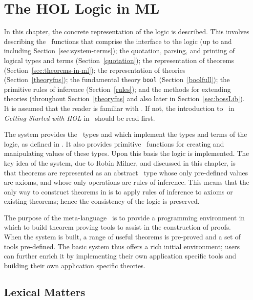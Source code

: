 \chapter{The HOL Logic in ML}\label{HOLsyschapter}

In this chapter, the concrete representation of the \HOL{} logic is
described.  This involves describing the \ML\ functions that comprise
the interface to the logic (up to and including
Section~\ref{sec:system-terms}); the quotation, parsing, and printing of
logical types and terms (Section~\ref{quotation}); the representation of
theorems (Section~\ref{sec:theorems-in-ml}); the representation of theories
(Section~\ref{theoryfns}); the fundamental \HOL{} theory \texttt{bool}
(Section~\ref{boolfull}); the primitive rules of inference
(Section~\ref{rules}); and the methods for extending theories
(throughout Section~\ref{theoryfns} and also later in
Section~\ref{sec:bossLib}).  It is assumed that the reader is familiar
with \ML.  If not, the introduction to \ML\ in {\sl Getting Started
with HOL\/} in \TUTORIAL\ should be read first.

The \HOL{} system provides the \ML\ types  and 
which implement the types and terms of the \HOL{} logic, as defined in
\LOGIC. It also provides primitive \ML\ functions for creating and
manipulating values of these types. Upon this basis the \HOL{} logic
is implemented. The key idea of the \HOL{} system, due to Robin
Milner, and discussed in this chapter, is that
theorems are represented as an abstract \ML\ type whose only
pre-defined values are axioms, and whose only operations are rules of
inference. This means that the only way to construct theorems in
\HOL{} is to apply rules of inference to axioms or existing theorems;
hence the consistency of the logic is preserved.

The purpose of the meta-language \ML\ is to provide a programming
environment in which to build theorem proving tools to assist in the
construction of proofs.  When the \HOL{} system is built, a range of
useful theorems is pre-proved and a set of tools pre-defined. The basic
system thus offers a rich initial environment; users can further enrich
it by implementing their own application specific tools and building
their own application specific theories.


\section{Lexical Matters}\label{HOL-lex}

